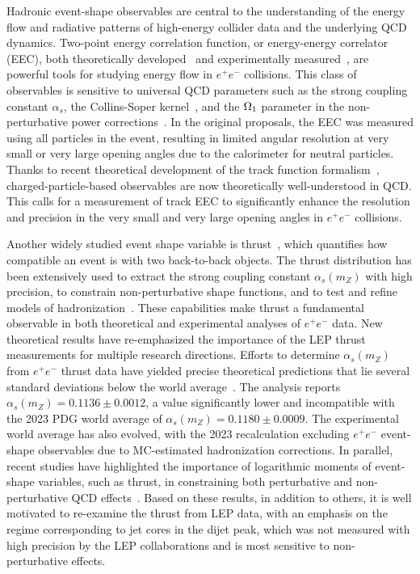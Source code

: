 \documentclass[a4paper,11pt]{article}
\begin{document}
Hadronic event-shape observables are central to the understanding of the energy flow and radiative patterns of high-energy collider data and the underlying QCD dynamics.
Two-point energy correlation function, or energy-energy correlator (EEC), both theoretically developed~\cite{PhysRevLett.41.1585,Basham:1978zq,Basham:1979gh,Basham:1977iq} and experimentally measured~\cite{OPAL:1990reb, OPAL:1993pnw,DELPHI:1990sof,DELPHI:2003yqh,DELPHI:2000uri,SLD:1994idb}, are powerful tools for studying energy flow in $e^{+}e^{-}$ collisions.
This class of observables is sensitive to universal QCD parameters such as the strong coupling constant $\alpha_s$, the Collins-Soper kernel~\cite{Collins:1981uw,Collins:1984kg}, and the $\rm \Omega_{1}$ parameter in the non-perturbative power corrections~\cite{Dokshitzer:1995qm, Korchemsky:1999kt}. 
In the original proposals, the EEC was measured using all particles in the event, resulting in limited angular resolution at very small or very large opening angles due to the calorimeter for neutral particles.
Thanks to recent theoretical development of the track function formalism~\cite{Chang:2013rca,Chang:2013iba}, charged-particle-based observables are now theoretically well-understood in QCD. 
This calls for a measurement of track EEC to significantly enhance the resolution and precision in the very small and very large opening angles in $e^{+}e^{-}$ collisions. 

Another widely studied event shape variable is thrust~\cite{PhysRevLett.39.1587, Georgi:1977sf, ALEPH:2003obs, DELPHI:2003yqh, DELPHI:2000uri, DELPHI:1999vbd}, which quantifies how compatible an event is with two back-to-back objects. 
The thrust distribution has been extensively used to extract the strong coupling constant $\alpha_s(m_Z)$ with high precision, to constrain non-perturbative shape functions, and to test and refine models of hadronization~\cite{Abbate:2010xh, Davison:2009wzs, Hartgring:2013jma}. 
These capabilities make thrust a fundamental observable in both theoretical and experimental analyses of $e^{+}e^{-}$ data.
New theoretical results have re-emphasized the importance of the LEP thrust measurements for multiple research directions. 
Efforts to determine $\alpha_s(m_Z)$ from $e^+e^-$ thrust data have yielded precise theoretical predictions that lie several standard deviations below the world average~\cite{Benitez:2024nav}. 
The analysis reports $\alpha_s(m_Z) = 0.1136 \pm 0.0012$, a value significantly lower and incompatible with the 2023 PDG world average of $\alpha_s(m_Z) = 0.1180 \pm 0.0009$. 
The experimental world average has also evolved, with the 2023 recalculation excluding $e^{+}e^{-}$ event-shape observables due to MC-estimated hadronization corrections. 
In parallel, recent studies have highlighted the importance of logarithmic moments of event-shape variables, such as thrust, in constraining both perturbative and non-perturbative QCD effects~\cite{Assi:2025ibi}. 
Based on these results, in addition to others, it is well motivated to re-examine the thrust from LEP data, with an emphasis on the regime corresponding to jet cores in the dijet peak, which was not measured with high precision by the LEP collaborations and is most sensitive to non-perturbative effects.
\end{document}
